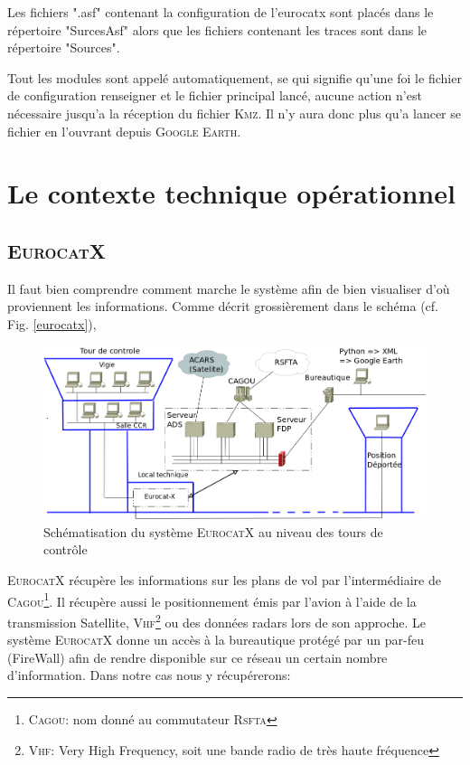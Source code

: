 Les fichiers ".asf" contenant la configuration de l’eurocatx sont placés dans le répertoire "SurcesAsf" alors que les fichiers contenant les traces sont dans le répertoire "Sources". 

Tout les modules sont appelé automatiquement, se qui signifie qu'une foi le fichier de configuration renseigner et le fichier principal lancé, aucune action n'est nécessaire jusqu'a la réception du fichier \textsc{Kmz}. Il n'y aura donc plus qu'a lancer se fichier en l'ouvrant depuis \textsc{Google Earth}. 

\section{Le contexte technique opérationnel}

    \subsection{\textsc{EurocatX}}
Il faut bien comprendre comment marche le système afin de bien visualiser d'où proviennent les informations. Comme décrit grossièrement dans le schéma (cf. Fig. \vref{eurocatx}),
\begin{figure}[!h]
    \center
    \includegraphics[width=15cm]{images/SchemaControle.png}
    \caption{Schématisation du système \textsc{EurocatX} au niveau des tours de contrôle}
    \label{eurocatx}
\end{figure}
\textsc{EurocatX} récupère les informations sur les plans de vol par l'intermédiaire de \textsc{Cagou}\footnote{\textsc{Cagou}: nom donné au commutateur \textsc{Rsfta}}. Il récupère aussi le positionnement émis par l'avion à l'aide de la transmission Satellite, \textsc{Vhf}\footnote{\textsc{Vhf}: Very High Frequency, soit une bande radio de très haute fréquence} ou des données radars lors de son approche. Le système \textsc{EurocatX} donne un accès à la bureautique protégé par un par-feu (FireWall) afin de rendre disponible sur ce réseau un certain nombre d'information. Dans notre cas nous y récupérerons:
